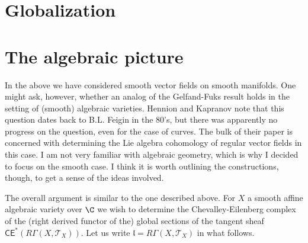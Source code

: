 \documentclass{amsart}
\theoremstyle{definition}
\newtheorem{definition}[lemma]{Definition}
\begin{document}
\section{Globalization}






\appendix

\section{The algebraic picture}

In the above we have considered smooth vector fields on smooth manifolds. 
One might ask, however, whether an analog of the Gelfand-Fuks result holds in 
the setting of (smooth) algebraic varieties. Hennion and Kapranov note that this 
question dates back to B.L. Feigin in the 80's, but there was apparently no 
progress on the question, even for the case of curves. The bulk of their paper 
is concerned with determining the Lie algebra cohomology of regular vector 
fields in this case. I am not very familiar with algebraic geometry, which is 
why I decided to focus on the smooth case. I think it is worth outlining the 
constructions, though, to get a sense of the ideas involved.

The overall argument is similar to the one described above. For $X$ a smooth 
affine algebraic variety over $\C$
we wish to determine the Chevalley-Eilenberg complex of
the (right derived functor of the) global sections of the tangent sheaf 
$\mathsf{CE}^\ast(R\Gamma(X, \mathcal{T}_X))$. Let us write 
$\mathfrak{l}=R\Gamma(X, \mathcal{T}_X)$ in what follows.
\end{document}
